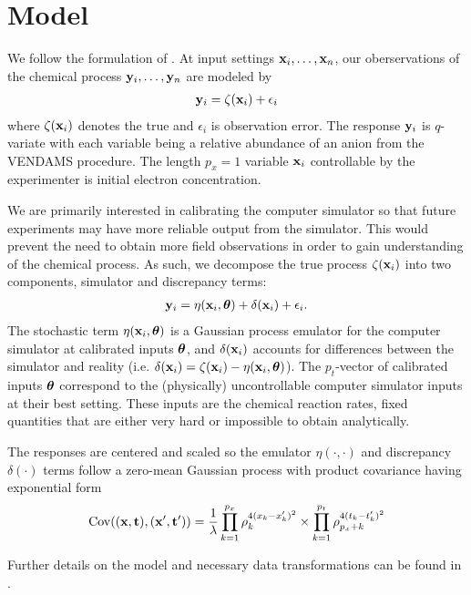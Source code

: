 \section{Model}

We follow the formulation of \cite{kennedy:2001}. At input settings $\mathbf{\bm{x}}_i,\ldots,\mathbf{\bm{x}}_n$, our oberservations of the chemical process $\mathbf{\bm{y}}_i,\ldots,\mathbf{\bm{y}}_n$ are modeled by
\begin{eqnarray}
\mathbf{\bm{y}}_i = \zeta(\mathbf{\bm{x}}_i) + \epsilon_i
\end{eqnarray}
where $\zeta(\mathbf{\bm{x}}_i)$ denotes the true and $\epsilon_i$ is observation error. The response $\mathbf{\bm{y}}_i$ is $q$-variate with each variable being a relative abundance of an anion from the VENDAMS procedure. The length $p_x=1$ variable $\mathbf{\bm{x}}_i$ controllable by the experimenter is initial electron concentration.

We are primarily interested in calibrating the computer simulator so that future experiments may have more reliable output from the simulator. This would prevent the need to obtain more field observations in order to gain understanding of the chemical process. As such, we decompose the true process $\zeta(\mathbf{\bm{x}}_i)$ into two components, simulator and discrepancy terms:
\begin{eqnarray}
\mathbf{\bm{y}}_i = \eta(\mathbf{\bm{x}}_i, \mathbf{\bm{\theta}}) + \delta(\mathbf{\bm{x}}_i) + \epsilon_i.
\end{eqnarray}
The stochastic term $\eta(\mathbf{\bm{x}}_i, \mathbf{\bm{\theta}})$ is a Gaussian process emulator for the computer simulator at calibrated inputs $\mathbf{\bm{\theta}}$, and $\delta(\mathbf{\bm{x}}_i)$ accounts for differences between the simulator and reality (i.e. $\delta(\mathbf{\bm{x}}_i) = \zeta(\mathbf{\bm{x}}_i) - \eta(\mathbf{\bm{x}}_i, \mathbf{\bm{\theta}})$). The $p_t$-vector of calibrated inputs $\mathbf{\bm{\theta}}$ correspond to the (physically) uncontrollable computer simulator inputs at their best setting. These inputs are the chemical reaction rates, fixed quantities that are either very hard or impossible to obtain analytically.

The responses are centered and scaled so the emulator $\eta(\cdot, \cdot)$ and discrepancy $\delta(\cdot)$ terms follow a zero-mean Gaussian process with product covariance having exponential form
\begin{eqnarray}
\mathrm{Cov}((\mathbf{\bm{x}},\mathbf{\bm{t}}),(\mathbf{\bm{x}}',\mathbf{\bm{t}}')) = \frac{1}{\lambda}\prod_{k=1}^{p_x}\rho_k^{4(x_k-x_k')^2}\times\prod_{k=1}^{p_t}\rho_{p_x+k}^{4(t_k-t_k')^2}
\end{eqnarray}

Further details on the model and necessary data transformations can be found in \cite{higdon:2008}.
